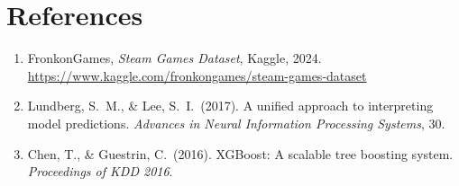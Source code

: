 \documentclass[11pt, a4paper]{article}
\begin{document}
\section{References}

\begin{enumerate}
  \item FronkonGames, \textit{Steam Games Dataset}, Kaggle, 2024.\\
        \url{https://www.kaggle.com/fronkongames/steam-games-dataset}
  \item Lundberg, S.\ M., \& Lee, S.\ I.\ (2017). A unified approach to interpreting
        model predictions. \textit{Advances in Neural Information Processing Systems}, 30.
  \item Chen, T., \& Guestrin, C.\ (2016). XGBoost: A scalable tree boosting system.
        \textit{Proceedings of KDD 2016}.
\end{enumerate}

\end{document}
